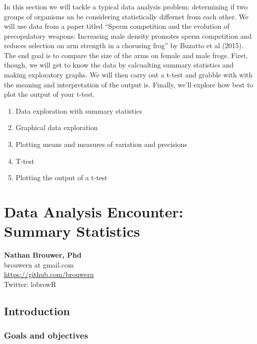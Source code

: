 \documentclass[]{book}
\providecommand{\tightlist}{%
  \setlength{\itemsep}{0pt}\setlength{\parskip}{0pt}}
\theoremstyle{definition}
\theoremstyle{definition}
\theoremstyle{definition}
\theoremstyle{remark}
\begin{document}
\hypertarget{section-3}{\subsection*{}\label{section-3}}

In this section we will tackle a typical data analysis problem:
determining if two groups of organisms an be considering statistically
differnet from each other. We will use data from a paper titled ``Sperm
competition and the evolution of precopulatory weapons: Increasing male
density promotes sperm competition and reduces selection on arm strength
in a chorusing frog'' by Buzatto et al (2015). The end goal is to
compare the size of the arms on female and male frogs. First, though, we
will get to know the data by calcualting summary statistics and making
exploratory graphs. We will then carry out a t-test and grabble with
with the meaning and interpretation of the output is. Finally, we'll
explore how best to plot the output of your t-test.

\begin{enumerate}
\def\labelenumi{\arabic{enumi}.}
\tightlist
\item
  Data exploration with summary statistics
\item
  Graphical data exploration
\item
  Plotting means and measures of variation and precisions
\item
  T-test
\item
  Plotting the output of a t-test
\end{enumerate}

\chapter{Data Analysis Encounter: Summary
Statistics}\label{data-analysis-encounter-summary-statistics}

\textbf{Nathan Brouwer, Phd}\\
brouwern at gmail.com\\
\url{https://github.com/brouwern}\\
Twitter: lobrowR

\section{Introduction}\label{introduction-8}

\subsection{Goals and objectives}\label{goals-and-objectives}
\end{document}
